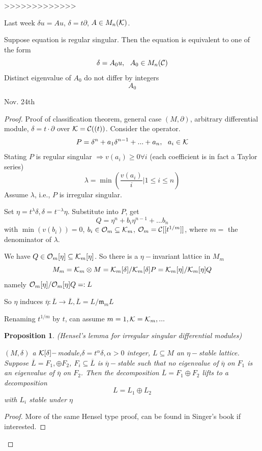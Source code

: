 \documentclass[11pt]{article}
\newtheorem{prop}[thm]{Proposition}
\newcommand{\pd}{\partial}
\newcommand{\scm}{{\mathfrak m}}
\newcommand{\calc}{{\cal C}}
\newcommand{\calk}{{\cal K}}
\newcommand{\calo}{{\cal O}}
\newcommand{\Lrta}{\Longrightarrow}
\newcommand{\lrta}{\longrightarrow}
\begin{document}
>>>>>>>>>>>>> 

Last week $\delta u= A u$, $\delta = t\pd$, $A\in M_n(\calk)$.

Suppose equation is regular singular. Then the equation is equivalent to one of the form
$$
\delta =A_0 u,\ \  A_0\in M_n (\calc)
$$
Distinct eigenvalue of $A_0$ do not differ by integers
$$
A_0
$$





Nov. 24th
\begin{proof}
Proof of classification theorem, general case $(M,\pd)$, arbitrary differential module, $\delta=t\cdot\pd$ over $\calk=\calc((t))$. Consider the operator.
$$
P=\delta^n+a_1\delta^{n-1}+...+a_n,\ \ a_i\in\calk
$$
Stating $P$ is regular singular $\Lrta v(a_i)\geq 0\forall i$ (each coefficient is in fact a Taylor series)
$$
\lambda=\min\left(\frac{v(a_i)}{i}|1\leq i\leq n\right)
$$
Assume $\lambda$, i.e., $P$ is irregular singular.

Set $\eta=t^\lambda \delta,\delta=t^{-\lambda}\eta$. Substitute into $P$, get 
$$
Q=\eta^n+b_i\eta^{n-1}+...b_n
$$
with $\min (v(b_i))=0$, $b_i\in\calo_m\subseteq \calk_m$, $\calo_m=\calc[[t^{1/m}]]$, where $m=$ the denominator of $\lambda$.

We have $Q\in\calo_m[\eta]\subseteq\calk_m[\eta]$. So there is a $\eta-$invariant lattice in $M_m$
$$
M_m=\calk_m\otimes M=\calk_m[\delta]/\calk_m[\delta]P=\calk_m[\eta]/\calk_m[\eta]Q
$$
namely $\calo_m[\eta]/\calo_m[\eta]Q=:L$

So $\eta$ induces $\overline{\eta}:\overline{L}\lrta\overline{L}, \overline{L}=L/\scm_m L$

Renaming $t^{1/m}$ by $t$, can assume $m=1,\calk=\calk_m,...$
\begin{prop}
(Hensel's lemma for irregular singular differential modules)

$(M,\delta)$ a $\calk[\delta]-$module,$\delta=t^\alpha\delta,\alpha >0$ integer, $L\subseteq M$ an $\eta-$stable lattice. Suppose $\overline{L}=F_1,\oplus F_2$, $F_i\subseteq \overline{L}$ is $\overline{\eta}-$stable such that no eigenvalue of $\overline{\eta}$ on $F_1$ is an eigenvalue of $\overline{\eta}$ on $F_2$. Then the decomposition $\overline{L}=F_1\oplus F_2$ lifts to a decomposition 
$$
L=L_1\oplus L_2
$$
with $L_i$ stable under $\eta$
\end{prop}
\begin{proof}
More of the same Hensel type proof, can be found in Singer's book if interested.
\end{proof}




\end{proof}
\end{document}
